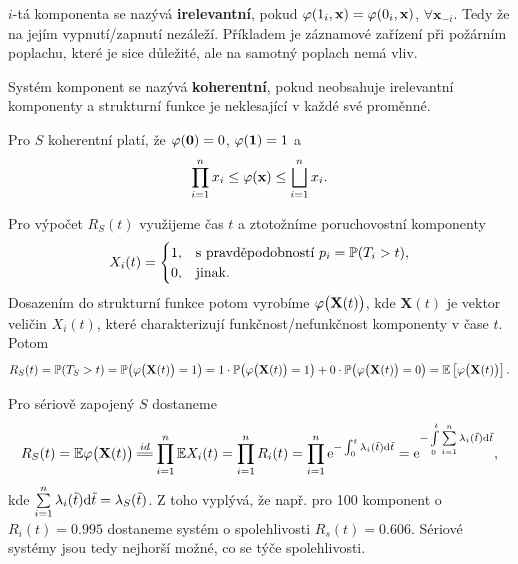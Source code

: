    \begin{define}
        $i$-tá komponenta se nazývá \textbf{irelevantní}, pokud $\crossedphi(1_i,\textbf{x})=\crossedphi(0_i,\textbf{x})$, $\forall\textbf{x}_{-i}$. Tedy že na jejím vypnutí/zapnutí nezáleží. Příkladem je záznamové zařízení při požárním poplachu, které je sice důležité, ale na samotný poplach nemá vliv.
    \end{define}

    \begin{define}
        Systém komponent se nazývá \textbf{koherentní}, pokud neobsahuje irelevantní komponenty a strukturní funkce je neklesající v každé své proměnné.
    \end{define}

    \begin{theorem}
        Pro $S$ koherentní platí, že $\crossedphi(\textbf{0})=0$, $\crossedphi(\textbf{1})=1$ a $$ \prod_{i=1}^n x_i\leq \crossedphi(\textbf{x})\leq \bigsqcup_{i=1}^n x_i. $$
    \end{theorem}

    \begin{define}
        Pro výpočet $R_S(t)$ využijeme čas $t$ a ztotožníme poruchovostní komponenty 
        $$X_i(t)=\begin{cases}1,&\text{s pravděpodobností }p_i=\mathbb{P}(T_i>t),\\0,&\text{jinak.}\end{cases}$$
        Dosazením do strukturní funkce potom vyrobíme $\crossedphi\big(\textbf{X}(t)\big)$, kde $\textbf{X}(t)$ je vektor veličin $X_i(t)$, které charakterizují funkčnost/nefunkčnost komponenty v čase $t$. Potom
        $$ R_S(t)=\PP(T_S>t)=\PP\big(\crossedphi\big(\textbf{X}(t)\big)=1\big)=1\cdot\PP\big(\crossedphi\big(\textbf{X}(t)\big)=1\big)+0\cdot\PP\big(\crossedphi\big(\textbf{X}(t)\big)=0\big)=\EE{\crossedphi\big(\textbf{X}(t)\big)}. $$
    \end{define}

    \begin{example}
        Pro sériově zapojený $S$ dostaneme
        $$ R_S(t)=\E \crossedphi\big(\textbf{X}(t)\big)\equal{id}\prod_{i=1}^n \E X_i(t)=\prod_{i=1}^n R_i(t)=\prod_{i=1}^n \e{-\int_{0}^{t}\lambda_i(\tilde{t})\d\tilde{t}}=\e{-\int\limits_{0}^t\sumin \lambda_i(\tilde{t})\d\tilde{t}}, $$
        kde $\sum\limits_{i=1}^{n} \lambda_i(\tilde{t})\mathrm{d}\tilde{t}=\lambda_S(\tilde{t})$. Z toho vyplývá, že např. pro 100 komponent o $R_i(t)=0.995$ dostaneme systém o spolehlivosti $R_s(t)=0.606$. Sériové systémy jsou tedy nejhorší možné, co se týče spolehlivosti. 
    \end{example}

